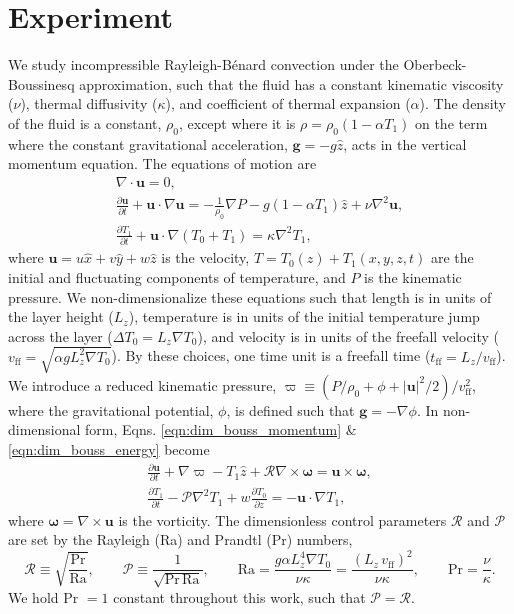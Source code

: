 \documentclass[aps, pre, onecolumn, nofootinbib, notitlepage, groupedaddress, amsfonts, amssymb, amsmath, longbibliography]{revtex4-1}
\newcommand{\DivU}{\ensuremath{\nabla\cdot\bm{u}}}
\newcommand{\grad}{\ensuremath{\nabla}}
\newcommand{\RB}{Rayleigh-B\'{e}nard }
\begin{document}

\section{Experiment}
\label{sec:experiment}
We study incompressible \RB convection under the Oberbeck-Boussinesq approximation,
such that the fluid
has a constant kinematic viscosity ($\nu$), thermal diffusivity ($\kappa$), and coefficient
of thermal expansion ($\alpha$). The density of the fluid is a constant, $\rho_0$,
except where it is $\rho = \rho_0(1  - \alpha T_1)$ on the term where
the constant gravitational acceleration, $\bm{g} = - g\hat{z}$, 
acts in the vertical momentum equation.
The equations of motion are \cite{spiegel&veronis1960}
\begin{gather}
\DivU = 0, 
	\label{eqn:incompressible}
\\
\frac{\partial \bm{u}}{\partial t} + \bm{u}\cdot\grad\bm{u} =
-\frac{1}{\rho_0}\grad P - g( 1 - \alpha T_1)\hat{z} + \nu\grad^2\bm{u}, 
	\label{eqn:dim_bouss_momentum}
\\
\frac{\partial T_1}{\partial t} + \bm{u}\cdot\grad(T_0 + T_1) = \kappa\grad^2 T_1,
	\label{eqn:dim_bouss_energy}
\end{gather}
where $\bm{u} = u\hat{x} + v\hat{y} + w\hat{z}$ is the velocity, 
$T = T_0(z) + T_1(x, y, z, t)$ are the initial and fluctuating components of temperature, 
and $P$ is the kinematic pressure.
We non-dimensionalize these equations such that
length is in units of the layer height ($L_z$),
temperature is in units of the initial temperature jump across the layer ($\Delta T_0 = L_z \grad T_0$), 
and velocity is in units of the freefall velocity ($v_{\text{ff}} = \sqrt{\alpha g L_z^2 \grad T_0}$).
By these choices, one time unit is a freefall time ($t_{\text{ff}} = L_z/v_{\text{ff}}$).
We introduce a reduced kinematic pressure,
$\varpi \equiv (P / \rho_0 + \phi + |\bm{u}|^2 / 2) / v_{\text{ff}}^2$, where the gravitational
potential, $\phi$, is defined such that $\bm{g} = -\grad \phi$. 
In non-dimensional form, Eqns. \ref{eqn:dim_bouss_momentum} \& \ref{eqn:dim_bouss_energy}
become
\begin{gather}
\frac{\partial \bm{u}}{\partial t} + \grad \varpi - T_1\hat{z} + \mathcal{R}\grad\times\bm{\omega} = \bm{u}\times\bm{\omega},
	\label{eqn:bouss_momentum}
\\
\frac{\partial T_1}{\partial t} - \mathcal{P}\grad^2 T_1 + w \frac{\partial T_0}{\partial z} = - \bm{u}\cdot\grad T_1,
	\label{eqn:bouss_energy}
\end{gather}
where $\bm{\omega} = \grad \times \bm{u}$ is the vorticity.
The dimensionless control parameters $\mathcal{R}$ and $\mathcal{P}$ 
are set by the Rayleigh (Ra) and Prandtl (Pr) numbers,
\begin{equation}
\mathcal{R} \equiv \sqrt{\frac{\text{Pr}}{\text{Ra}}}, \qquad \mathcal{P} \equiv \frac{1}{\sqrt{\text{Pr}\,\text{Ra}}}, \qquad
\text{Ra} = \frac{g \alpha L_z^4 \grad T_0}{\nu\kappa} = \frac{(L_z\,v_{\text{ff}})^2}{\nu\kappa}, \qquad \text{Pr} = \frac{\nu}{\kappa}.
\end{equation}
We hold Pr $= 1$ constant throughout this work, such that $\mathcal{P} = \mathcal{R}$.
\end{document}
